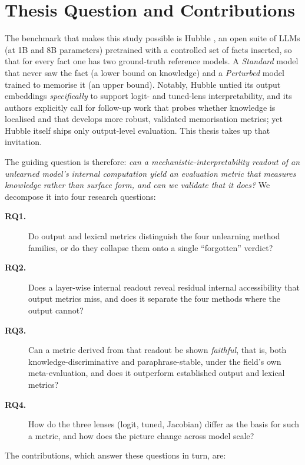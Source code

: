 \section{Thesis Question and Contributions}
\label{sec:contributions}

The benchmark that makes this study possible is Hubble \citep{allegro2025hubble}, an open suite of LLMs
(at 1B and 8B parameters) pretrained with a controlled set of facts inserted, so that for every fact one has
two ground-truth reference models. A \emph{Standard} model that never saw the fact (a lower bound on
knowledge) and a \emph{Perturbed} model trained to memorise it (an upper bound). Notably, Hubble untied its
output embeddings \emph{specifically} to support logit- and tuned-lens interpretability, and its authors
explicitly call for follow-up work that probes whether knowledge is localised and that develops more robust,
validated memorisation metrics; yet Hubble itself ships only output-level evaluation. This thesis takes up
that invitation.

The guiding question is therefore: \emph{can a mechanistic-interpretability readout of an unlearned model's
internal computation yield an evaluation metric that measures knowledge rather than surface form, and can we
validate that it does?} We decompose it into four research questions:
\begin{description}
  \item[\textbf{RQ1.}] Do output and lexical metrics distinguish the four unlearning method families, or do
  they collapse them onto a single ``forgotten'' verdict?
  \item[\textbf{RQ2.}] Does a layer-wise internal readout reveal residual internal accessibility that output
  metrics miss, and does it separate the four methods where the output cannot?
  \item[\textbf{RQ3.}] Can a metric derived from that readout be shown \emph{faithful}, that is, both
  knowledge-discriminative and paraphrase-stable, under the field's own meta-evaluation, and does
  it outperform established output and lexical metrics?
  \item[\textbf{RQ4.}] How do the three lenses (logit, tuned, Jacobian) differ as the basis for such a
  metric, and how does the picture change across model scale?
\end{description}
The contributions, which answer these questions in turn, are:

